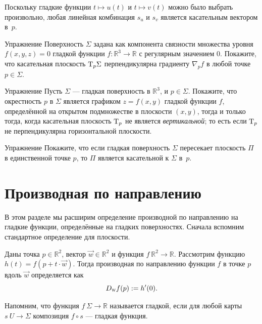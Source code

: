 Поскольку гладкие функции $t\mapsto u(t)$ и $t\mapsto v(t)$ можно было выбрать произвольно, любая линейная комбинация $s_u$ и $s_v$ является касательным вектором в~$p$. 
\qeds

\begin{thm}{Упражнение}\label{ex:tangent-normal}
Поверхность $\Sigma$ задана как компонента связности множества уровня $f(x,y,z)=0$ гладкой функции $f:\mathbb{R}^3\to\mathbb{R}$ с регулярным значением $0$.
Покажите, что касательная плоскость $\mathrm{T}_p\Sigma$ перпендикулярна градиенту $\nabla_pf$ в любой точке $p\in\Sigma$.
\end{thm}

{\sloppy

\begin{thm}{Упражнение}\label{ex:vertical-tangent}
Пусть $\Sigma$ --- гладкая поверхность в $\mathbb{R}^3$, и $p\in\Sigma$.
Покажите, что окрестность $p$ в $\Sigma$ является графиком $z=f(x,y)$ гладкой функции $f$, определённой на открытом подмножестве в плоскости $(x,y)$, тогда и только тогда, когда касательная плоскость $\mathrm{T}_p$ не является {}\emph{вертикальной}; то есть если $\mathrm{T}_p$ не перпендикулярна горизонтальной плоскости.
\end{thm}

}

\begin{thm}{Упражнение}\label{ex:tangent-single-point}
Покажите, что если гладкая поверхность $\Sigma$ пересекает плоскость $\Pi$ в единственной точке $p$, то $\Pi$ является касательной к $\Sigma$ в~$p$.
\end{thm}

\section{Производная по направлению}\label{sec:dirder}

В этом разделе мы расширим определение производной по направлению на гладкие функции, определённые на гладких поверхностях.
Сначала вспомним стандартное определение для плоскости.

Даны точка $p\in \mathbb{R}^2$, вектор $\vec w\in \mathbb{R}^2$ и функция $f\:\mathbb{R}^2\to\mathbb{R}$.
Рассмотрим функцию
$h(t)=f(p+t\cdot\vec w)$.
Тогда производная по направлению функции $f$ в точке $p$ вдоль $\vec w$ определяется как 
\[D_{\text{\sc{w}}}f(p)\mathrel{:=} h'(0).\]

Напомним, что функция $f\: \Sigma \to \mathbb{R}$ называется гладкой, если для любой карты $s\: U \to \Sigma$ композиция $f \circ s$ --- гладкая функция.

